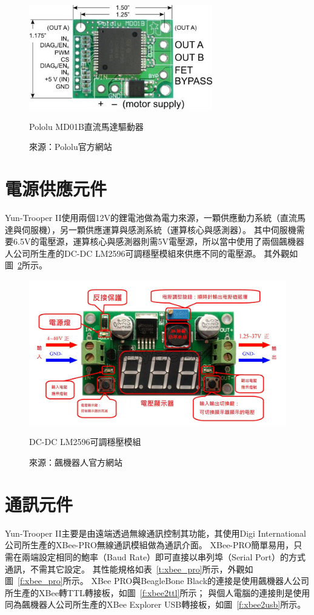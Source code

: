 \begin{figure}[h!]
	\centering
	\includegraphics[width=8cm]{figures/motor_driver}
	\caption{Pololu MD01B直流馬達驅動器}
	\caption*{來源：Pololu官方網站}
	\label{f:motor_driver}
\end{figure}

\section{電源供應元件}
Yun-Trooper II使用兩個12V的鋰電池做為電力來源，一顆供應動力系統（直流馬達與伺服機），另一顆供應運算與感測系統（運算核心與感測器）。
其中伺服機需要6.5V的電壓源，運算核心與感測器則需5V電壓源，所以當中使用了兩個飆機器人公司所生產的DC-DC LM2596可調穩壓模組來供應不同的電壓源。
其外觀如圖~\ref{f:lm2596}所示。

\begin{figure}[h!]
	\centering
	\includegraphics[width=14cm]{figures/LM2596}
	\caption{DC-DC LM2596可調穩壓模組}
	\caption*{來源：飆機器人官方網站}
	\label{f:lm2596}
\end{figure}

\section{通訊元件}
Yun-Trooper II主要是由遠端透過無線通訊控制其功能，其使用Digi International公司所生產的XBee-PRO無線通訊模組做為通訊介面。
XBee-PRO簡單易用，只需在兩端設定相同的鮑率（Baud Rate）即可直接以串列埠（Serial Port）的方式通訊，不需其它設定。
其性能規格如表~\ref{t:xbee_pro}所示，外觀如圖~\ref{f:xbee_pro}所示。
XBee PRO與BeagleBone Black的連接是使用飆機器人公司所生產的XBee轉TTL轉接板，如圖~\ref{f:xbee2ttl}所示；
與個人電腦的連接則是使用同為飆機器人公司所生產的XBee Explorer USB轉接板，如圖~\ref{f:xbee2usb}所示。


